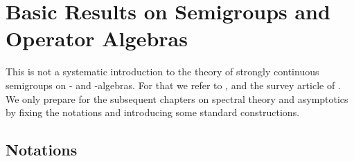 
\chapter{Basic Results on Semigroups and Operator Algebras}\label{chap:D-I}

This is not a systematic introduction to the theory of strongly continuous semigroups on \CA- and \WA-algebras.
For that we refer to \citet{brattelirobinson:1979}, \citet{davies:1976} and the survey article of \citet{oseledets:1984}.
We only prepare for the subsequent chapters on spectral theory and asymptotics by fixing the notations and introducing some standard constructions.

\section{Notations}\label{sec:d1-1}

